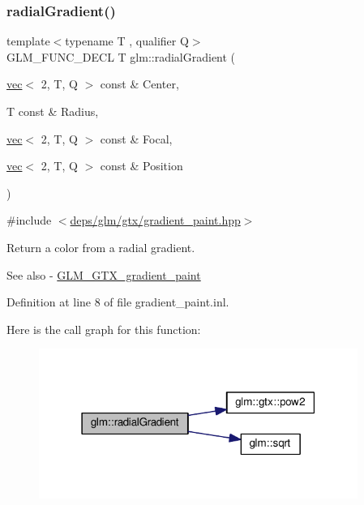 \subsubsection{\texorpdfstring{radial\+Gradient()}{radialGradient()}}
{\footnotesize\ttfamily template$<$typename T , qualifier Q$>$ \\
G\+L\+M\+\_\+\+F\+U\+N\+C\+\_\+\+D\+E\+CL T glm\+::radial\+Gradient (\begin{DoxyParamCaption}\item[{\hyperlink{structglm_1_1vec}{vec}$<$ 2, T, Q $>$ const \&}]{Center,  }\item[{T const \&}]{Radius,  }\item[{\hyperlink{structglm_1_1vec}{vec}$<$ 2, T, Q $>$ const \&}]{Focal,  }\item[{\hyperlink{structglm_1_1vec}{vec}$<$ 2, T, Q $>$ const \&}]{Position }\end{DoxyParamCaption})}



{\ttfamily \#include $<$\hyperlink{gradient__paint_8hpp}{deps/glm/gtx/gradient\+\_\+paint.\+hpp}$>$}

Return a color from a radial gradient. \begin{DoxySeeAlso}{See also}
-\/ \hyperlink{group__gtx__gradient__paint}{G\+L\+M\+\_\+\+G\+T\+X\+\_\+gradient\+\_\+paint} 
\end{DoxySeeAlso}


Definition at line 8 of file gradient\+\_\+paint.\+inl.

Here is the call graph for this function\+:
\nopagebreak
\begin{figure}[H]
\begin{center}
\leavevmode
\includegraphics[width=295pt]{d2/d8d/group__gtx__gradient__paint_gaaecb1e93de4cbe0758b882812d4da294_cgraph}
\end{center}
\end{figure}
